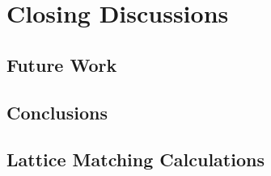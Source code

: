 \documentclass[letterpaper,12pt,twoside]{report}
\begin{document}
\part{Closing Discussions}
\chapter{Future Work}

\chapter{Conclusions}


\appendix
\chapter{Lattice Matching Calculations}
\label{apndx:lattice-matches}


\printbibliography{}
\end{document}
